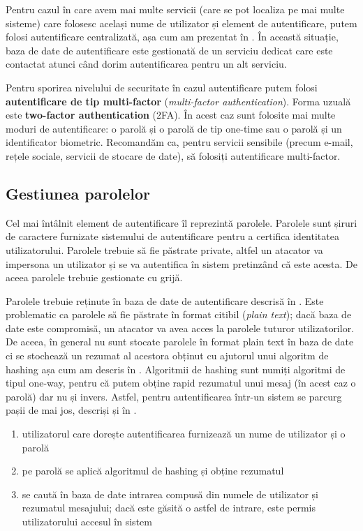 Pentru cazul în care avem mai multe servicii (care se pot localiza pe mai multe sisteme) care folosesc același nume de utilizator și element de autentificare, putem folosi autentificare centralizată, așa cum am prezentat în . În această situație, baza de date de autentificare este gestionată de un serviciu dedicat care este contactat atunci când dorim autentificarea pentru un alt serviciu.

Pentru sporirea nivelului de securitate în cazul autentificare putem folosi \textbf{autentificare de tip multi-factor} (\textit{multi-factor authentication}). Forma uzuală este \textbf{two-factor authentication} (2FA). În acest caz sunt folosite mai multe moduri de autentificare: o parolă și o parolă de tip one-time sau o parolă și un identificator biometric. Recomandăm ca, pentru servicii sensibile (precum e-mail, rețele sociale, servicii de stocare de date), să folosiți autentificare multi-factor.

\subsection{Gestiunea parolelor}
\label{sec:sec:auth:password}

Cel mai întâlnit element de autentificare îl reprezintă parolele. Parolele sunt șiruri de caractere furnizate sistemului de autentificare pentru a certifica identitatea utilizatorului. Parolele trebuie să fie păstrate private, altfel un atacator va impersona un utilizator și se va autentifica în sistem pretinzând că este acesta. De aceea parolele trebuie gestionate cu grijă.

Parolele trebuie reținute în baza de date de autentificare descrisă în . Este problematic ca parolele să fie păstrate în format citibil (\textit{plain text}); dacă baza de date este compromisă, un atacator va avea acces la parolele tuturor utilizatorilor. De aceea, în general nu sunt stocate parolele în format plain text în baza de date ci se stochează un rezumat al acestora obținut cu ajutorul unui algoritm de hashing așa cum am descris în . Algoritmii de hashing sunt numiți algoritmi de tipul one-way, pentru că putem obține rapid rezumatul unui mesaj (în acest caz o parolă) dar nu și invers. Astfel, pentru autentificarea într-un sistem se parcurg pașii de mai jos, descriși și în .

\begin{enumerate}
  \item utilizatorul care dorește autentificarea furnizează un nume de utilizator și o parolă
  \item pe parolă se aplică algoritmul de hashing și obține rezumatul
  \item se caută în baza de date intrarea compusă din numele de utilizator și rezumatul mesajului; dacă este găsită o astfel de intrare, este permis utilizatorului accesul în sistem
\end{enumerate}

